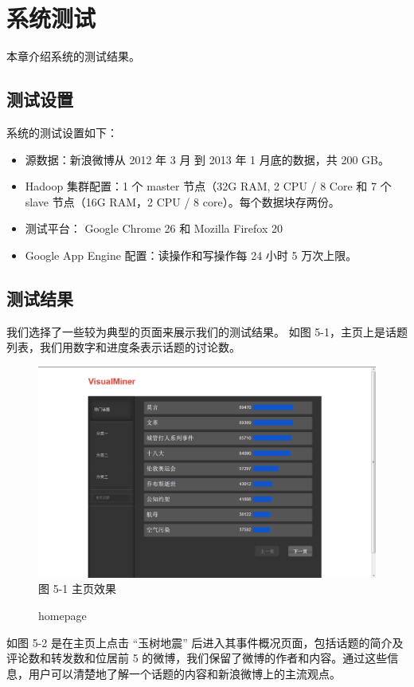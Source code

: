 \chapter{系统测试}
\thispagestyle{fancy}
本章介绍系统的测试结果。

\section{测试设置}
系统的测试设置如下：
\begin{itemize}
\item 源数据：新浪微博从 2012 年 3 月 到 2013 年 1 月底的数据，共 200 GB。
\item Hadoop 集群配置：1 个 master 节点（32G RAM, 2 CPU / 8 Core 和 7 个 slave 节点（16G RAM，2 CPU / 8 core）。每个数据块存两份。
\item 测试平台： Google Chrome 26 和 Mozilla Firefox 20 
\item Google App Engine 配置：读操作和写操作每 24 小时 5 万次上限。
\end{itemize}

\section{测试结果}	
我们选择了一些较为典型的页面来展示我们的测试结果。
如图 5-1，主页上是话题列表，我们用数字和进度条表示话题的讨论数。
\begin{figure}[!h]
\centering
\includegraphics[width=\textwidth, height=0.35\textheight]{show_main}
图 5-1 主页效果
\caption{homepage}
\end{figure}

如图 5-2 是在主页上点击 “玉树地震” 后进入其事件概况页面，包括话题的简介及评论数和转发数和位居前 5 的微博，我们保留了微博的作者和内容。通过这些信息，用户可以清楚地了解一个话题的内容和新浪微博上的主流观点。


